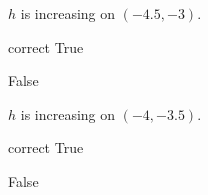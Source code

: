 \documentclass{ximera}
\begin{document}
\begin{exercise}
\begin{question}
\end{question}








\begin{question}
$h$ is increasing on $(-4.5,-3)$.

\begin{multipleChoice}
\item [correct]{True}
\item {False}
\end{multipleChoice}

\end{question}








\begin{question}
$h$ is increasing on $(-4,-3.5)$.

\begin{multipleChoice}
\item [correct]{True}
\item {False}
\end{multipleChoice}

\end{question}





\end{exercise}
\end{document}
